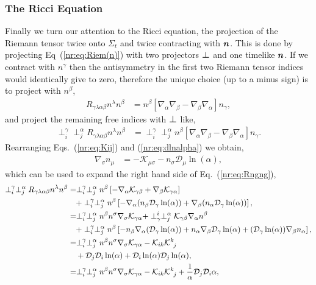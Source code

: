 \subsubsection{The Ricci Equation}
Finally we turn our attention to the Ricci equation, the projection of the Riemann tensor twice onto $\Sigma_t$ and twice contracting with $\boldsymbol{n}$. This is done by projecting Eq~(\ref{nr:eq:Riem(n)}) with two projectors $\boldsymbol{\perp}$ and one timelike $\boldsymbol{n}$. If we contract with $n^\gamma$ then the antisymmetry in the first two Riemann tensor indices would identically give to zero, therefore the unique choice (up to a minus sign) is to project with $n^\beta$,
\begin{align}
R_{\gamma\lambda\alpha\beta}n^\lambda n^\beta &=
 n^\beta \left[ \nabla_\alpha\nabla_\beta-\nabla_\beta\nabla_\alpha\right]n_\gamma, 
\end{align}
and project the remaining free indices with $\boldsymbol{\perp}$ like,
\begin{align} \label{nr:eq:Rngng}
\perp_i^\gamma \perp^\alpha_j R_{\gamma\lambda\alpha\beta}n^\lambda n^\beta &=
 \perp_i^\gamma \perp^\alpha_j n^\beta \left[ \nabla_\alpha\nabla_\beta-\nabla_\beta\nabla_\alpha\right]n_\gamma. 
\end{align}
Rearranging Eqs.~(\ref{nr:eq:Kij}) and (\ref{nr:eq:dlnalpha}) we obtain,
\begin{align} \nabla_\sigma n_\mu &= -\mathcal{K}_{\mu\sigma}-n_\sigma \mathcal{D}_\mu \ln(\alpha), 
\end{align}
which can be used to expand the right hand side of Eq.~(\ref{nr:eq:Rngng}),
\begin{align} \label{nr:eq:Rngng}
\perp_i^\gamma \perp^\alpha_j R_{\gamma\lambda\alpha\beta}n^\lambda n^\beta &=
 \perp_i^\gamma \perp^\alpha_j n^\beta \left[ -\nabla_\alpha\mathcal{K}_{\gamma\beta}+\nabla_\beta \mathcal{K}_{\gamma\alpha}\right]  \\ \nonumber&\quad+
 \perp_i^\gamma \perp^\alpha_j n^\beta \left[ -\nabla_\alpha (n_\beta \mathcal{D}_\gamma \ln(\alpha)) +\nabla_\beta (n_\alpha \mathcal{D}_\gamma \ln(\alpha))\right], \\
 &=
 \perp_i^\gamma \perp^\alpha_j n^\beta n^\sigma \nabla_\sigma \mathcal{K}_{\gamma\alpha} +  \perp^i_\gamma \perp^\alpha_j   \mathcal{K}_{\gamma\beta} \nabla_\alpha n^\beta  \\ \nonumber&\quad+
 \perp_i^\gamma \perp^\alpha_j n^\beta \left[ -n_\beta \nabla_\alpha ( \mathcal{D}_\gamma \ln(\alpha)) +n_\alpha \nabla_\beta \mathcal{D}_\gamma \ln(\alpha)  
 + ( \mathcal{D}_\gamma \ln(\alpha))  \nabla_\beta n_\alpha\right], \\ 
  &=
 \perp_i^\gamma \perp^\alpha_j n^\beta n^\sigma \nabla_\sigma \mathcal{K}_{\gamma\alpha} -   \mathcal{K}_{ik} \mathcal{K}^k_{\,\,\,j}  \\ \nonumber&\quad+
 \mathcal{D}_j \mathcal{D}_i \ln(\alpha) + \mathcal{D}_i \ln(\alpha) \mathcal{D}_j \ln(\alpha)   , \\ 
 &=
 \perp_i^\gamma \perp^\alpha_j n^\beta n^\sigma \nabla_\sigma \mathcal{K}_{\gamma\alpha} -   \mathcal{K}_{ik} \mathcal{K}^k_{\,\,\,j}  + \frac{1}{\alpha} \mathcal{D}_j \mathcal{D}_i \alpha   ,
\end{align}
